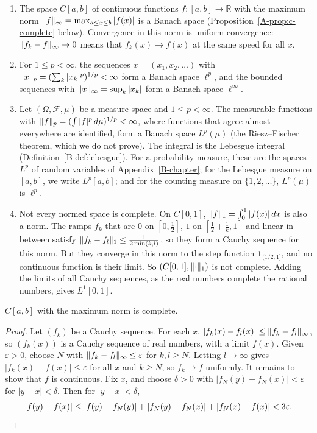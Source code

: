 \begin{example}\label{A-ex:banach-spaces}
    \begin{enumerate}
        \item The space $C[a, b]$ of continuous functions $f: [a, b] \to \mathbb{R}$ with the maximum norm $\lVert f \rVert_\infty = \max_{a \leq x \leq b}|f(x)|$ is a Banach space (Proposition~\ref{A-prop:c-complete} below). Convergence in this norm is uniform convergence: $\lVert f_k - f \rVert_\infty \to 0$ means that $f_k(x) \to f(x)$ at the same speed for all $x$.
        \item For $1 \leq p < \infty$, the sequences $x = (x_1, x_2, \ldots)$ with $\lVert x \rVert_p = (\sum_k |x_k|^p)^{1/p} < \infty$ form a Banach space $\ell^p$, and the bounded sequences with $\lVert x \rVert_\infty = \sup_k |x_k|$ form a Banach space $\ell^\infty$.
        \item Let $(\Omega, \mathcal{F}, \mu)$ be a measure space and $1 \leq p < \infty$. The measurable functions with $\lVert f \rVert_p = (\int |f|^p\, d\mu)^{1/p} < \infty$, where functions that agree almost everywhere are identified, form a Banach space $L^p(\mu)$ (the Riesz--Fischer theorem, which we do not prove). The integral is the Lebesgue integral (Definition~\ref{B-def:lebesgue}). For a probability measure, these are the spaces $L^p$ of random variables of Appendix~\ref{B-chapter}; for the Lebesgue measure on $[a, b]$, we write $L^p[a, b]$; and for the counting measure on $\{1, 2, \ldots\}$, $L^p(\mu)$ is $\ell^p$.
        \item Not every normed space is complete. On $C[0, 1]$, $\lVert f \rVert_1 = \int_0^1 |f(x)|\, dx$ is also a norm. The ramps $f_k$ that are $0$ on $[0, \frac{1}{2}]$, $1$ on $[\frac{1}{2} + \frac{1}{k}, 1]$ and linear in between satisfy $\lVert f_k - f_l \rVert_1 \leq \frac{1}{2\min(k, l)}$, so they form a Cauchy sequence for this norm. But they converge in this norm to the step function $\mathbf{1}_{(1/2, 1]}$, and no continuous function is their limit. So $(C[0, 1], \lVert \cdot \rVert_1)$ is not complete. Adding the limits of all Cauchy sequences, as the real numbers complete the rational numbers, gives $L^1[0, 1]$.
    \end{enumerate}
\end{example}

\begin{proposition}\label{A-prop:c-complete}
    $C[a, b]$ with the maximum norm is complete.
\end{proposition}

\begin{proof}
    Let $(f_k)$ be a Cauchy sequence. For each $x$, $|f_k(x) - f_l(x)| \leq \lVert f_k - f_l \rVert_\infty$, so $(f_k(x))$ is a Cauchy sequence of real numbers, with a limit $f(x)$. Given $\varepsilon > 0$, choose $N$ with $\lVert f_k - f_l \rVert_\infty \leq \varepsilon$ for $k, l \geq N$. Letting $l \to \infty$ gives $|f_k(x) - f(x)| \leq \varepsilon$ for all $x$ and $k \geq N$, so $f_k \to f$ uniformly. It remains to show that $f$ is continuous. Fix $x$, and choose $\delta > 0$ with $|f_N(y) - f_N(x)| < \varepsilon$ for $|y - x| < \delta$. Then for $|y - x| < \delta$,
    \[|f(y) - f(x)| \leq |f(y) - f_N(y)| + |f_N(y) - f_N(x)| + |f_N(x) - f(x)| < 3\varepsilon. \qedhere\]
\end{proof}

